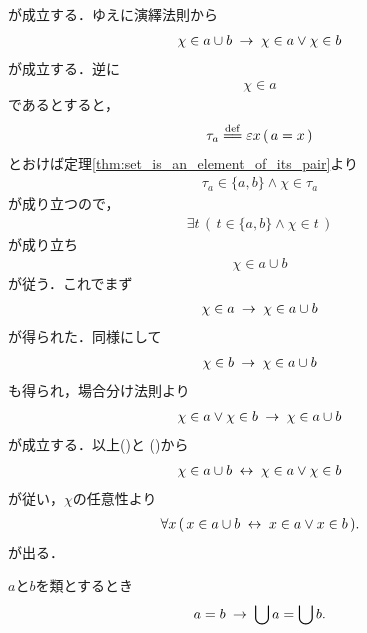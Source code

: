 \begin{sketch}
		が成立する．ゆえに演繹法則から
		\begin{align}
			\chi \in a \cup b \hspace{0.25em}\rightarrow\hspace{0.25em} \chi \in a \vee \chi \in b
			\label{fom:thm_union_of_pair_is_union_of_their_elements_2}
		\end{align}
		が成立する．逆に
		\begin{align}
			\chi \in a
		\end{align}
		であるとすると，
		\begin{align}
			\tau_a \defeq \varepsilon x\, (\, a = x\, )
		\end{align}
		とおけば定理\ref{thm:set_is_an_element_of_its_pair}より
		\begin{align}
			\tau_a \in \{a,b\} \wedge \chi \in \tau_a
		\end{align}
		が成り立つので，
		\begin{align}
			\exists t\, \left(\, t \in \{a,b\} \wedge \chi \in t\, \right)
		\end{align}
		が成り立ち
		\begin{align}
			\chi \in a \cup b
		\end{align}
		が従う．これでまず
		\begin{align}
			\chi \in a \hspace{0.25em}\rightarrow\hspace{0.25em} \chi \in a \cup b
		\end{align}
		が得られた．同様にして
		\begin{align}
			\chi \in b \hspace{0.25em}\rightarrow\hspace{0.25em} \chi \in a \cup b
		\end{align}
		も得られ，場合分け法則より
		\begin{align}
			\chi \in a \vee \chi \in b \hspace{0.25em}\rightarrow\hspace{0.25em} \chi \in a \cup b
			\label{fom:thm_union_of_pair_is_union_of_their_elements_3}
		\end{align}
		が成立する．以上()と
		()から
		\begin{align}
			\chi \in a \cup b \hspace{0.25em}\leftrightarrow\hspace{0.25em} \chi \in a \vee \chi \in b
		\end{align}
		が従い，$\chi$の任意性より
		\begin{align}
			\forall x\, (\, x \in a \cup b \hspace{0.25em}\leftrightarrow\hspace{0.25em} x \in a \vee x \in b\, ).
		\end{align}
		が出る．
		\QED
	\end{sketch}
	
	\begin{screen}
		\begin{thm}[等しい類の合併は等しい]\label{thm:unions_of_equal_classes_are_equal}
			$a$と$b$を類とするとき
			\begin{align}
				a = b \hspace{0.25em}\rightarrow\hspace{0.25em} \bigcup a = \bigcup b.
			\end{align}
		\end{thm}
	\end{screen}
	
